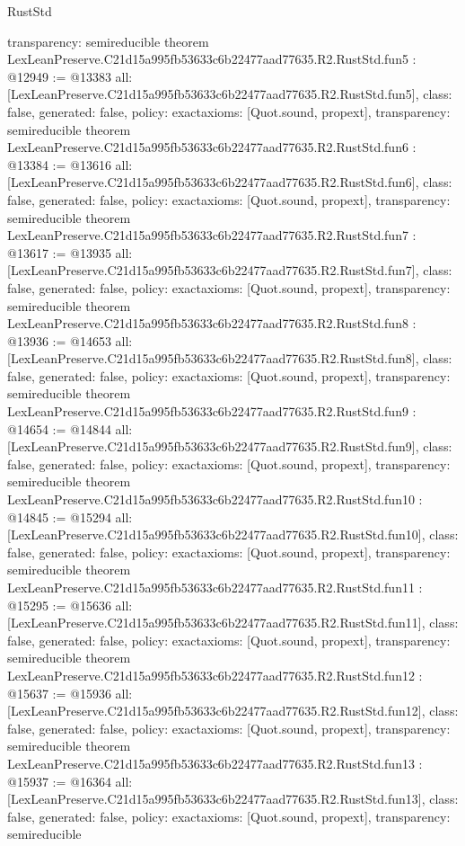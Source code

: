 \begin{lexlean}{RustStd}
\begin{coremodule}
{  transparency: semireducible
}
theorem LexLeanPreserve.C21d15a995fb53633c6b22477aad77635.R2.RustStd.fun5 : @12949 := @13383 {
  all: [LexLeanPreserve.C21d15a995fb53633c6b22477aad77635.R2.RustStd.fun5],
  class: false,
  generated: false,
  policy: exact{axioms: [Quot.sound, propext]},
  transparency: semireducible
}
theorem LexLeanPreserve.C21d15a995fb53633c6b22477aad77635.R2.RustStd.fun6 : @13384 := @13616 {
  all: [LexLeanPreserve.C21d15a995fb53633c6b22477aad77635.R2.RustStd.fun6],
  class: false,
  generated: false,
  policy: exact{axioms: [Quot.sound, propext]},
  transparency: semireducible
}
theorem LexLeanPreserve.C21d15a995fb53633c6b22477aad77635.R2.RustStd.fun7 : @13617 := @13935 {
  all: [LexLeanPreserve.C21d15a995fb53633c6b22477aad77635.R2.RustStd.fun7],
  class: false,
  generated: false,
  policy: exact{axioms: [Quot.sound, propext]},
  transparency: semireducible
}
theorem LexLeanPreserve.C21d15a995fb53633c6b22477aad77635.R2.RustStd.fun8 : @13936 := @14653 {
  all: [LexLeanPreserve.C21d15a995fb53633c6b22477aad77635.R2.RustStd.fun8],
  class: false,
  generated: false,
  policy: exact{axioms: [Quot.sound, propext]},
  transparency: semireducible
}
theorem LexLeanPreserve.C21d15a995fb53633c6b22477aad77635.R2.RustStd.fun9 : @14654 := @14844 {
  all: [LexLeanPreserve.C21d15a995fb53633c6b22477aad77635.R2.RustStd.fun9],
  class: false,
  generated: false,
  policy: exact{axioms: [Quot.sound, propext]},
  transparency: semireducible
}
theorem LexLeanPreserve.C21d15a995fb53633c6b22477aad77635.R2.RustStd.fun10 : @14845 := @15294 {
  all: [LexLeanPreserve.C21d15a995fb53633c6b22477aad77635.R2.RustStd.fun10],
  class: false,
  generated: false,
  policy: exact{axioms: [Quot.sound, propext]},
  transparency: semireducible
}
theorem LexLeanPreserve.C21d15a995fb53633c6b22477aad77635.R2.RustStd.fun11 : @15295 := @15636 {
  all: [LexLeanPreserve.C21d15a995fb53633c6b22477aad77635.R2.RustStd.fun11],
  class: false,
  generated: false,
  policy: exact{axioms: [Quot.sound, propext]},
  transparency: semireducible
}
theorem LexLeanPreserve.C21d15a995fb53633c6b22477aad77635.R2.RustStd.fun12 : @15637 := @15936 {
  all: [LexLeanPreserve.C21d15a995fb53633c6b22477aad77635.R2.RustStd.fun12],
  class: false,
  generated: false,
  policy: exact{axioms: [Quot.sound, propext]},
  transparency: semireducible
}
theorem LexLeanPreserve.C21d15a995fb53633c6b22477aad77635.R2.RustStd.fun13 : @15937 := @16364 {
  all: [LexLeanPreserve.C21d15a995fb53633c6b22477aad77635.R2.RustStd.fun13],
  class: false,
  generated: false,
  policy: exact{axioms: [Quot.sound, propext]},
  transparency: semireducible
}
\end{coremodule}
\end{lexlean}
